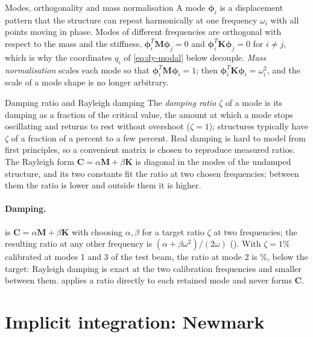 \begin{sidenote}{Modes, orthogonality and mass normalisation}
A mode $\bm\phi_i$ is a displacement pattern that the structure can repeat harmonically at one frequency $\omega_i$ with all points moving in phase. Modes of different frequencies are orthogonal with respect to the mass and the stiffness, $\bm\phi_i^T\bm M\bm\phi_j=0$ and $\bm\phi_i^T\bm K\bm\phi_j=0$ for $i\ne j$, which is why the coordinates $q_i$ of \eqref{eq:dy-modal} below decouple. \emph{Mass normalisation} scales each mode so that $\bm\phi_i^T\bm M\bm\phi_i=1$; then $\bm\phi_i^T\bm K\bm\phi_i=\omega_i^2$, and the scale of a mode shape is no longer arbitrary.
\end{sidenote}

\begin{sidenote}{Damping ratio and Rayleigh damping}
The \emph{damping ratio} $\zeta$ of a mode is its damping as a fraction of the critical value, the amount at which a mode stops oscillating and returns to rest without overshoot ($\zeta=1$); structures typically have $\zeta$ of a fraction of a percent to a few percent. Real damping is hard to model from first principles, so a convenient matrix is chosen to reproduce measured ratios. The Rayleigh form $\bm C=\alpha\bm M+\beta\bm K$ is diagonal in the modes of the undamped structure, and its two constants fit the ratio at two chosen frequencies; between them the ratio is lower and outside them it is higher.
\end{sidenote}

\paragraph{Damping.}  is $\bm C=\alpha\bm M+\beta\bm K$ with  choosing $\alpha,\beta$ for a target ratio $\zeta$ at two frequencies; the resulting ratio at any other frequency is $(\alpha+\beta\omega^2)/(2\omega)$ (). With $\zeta=1\%$ calibrated at modes 1 and 3 of the test beam, the ratio at mode 2 is \cdyRayleighMid{}\%, below the target: Rayleigh damping is exact at the two calibration frequencies and smaller between them.  applies a ratio directly to each retained mode and never forms $\bm C$.

\section{Implicit integration: Newmark}\label{sec:dy-newmark}

